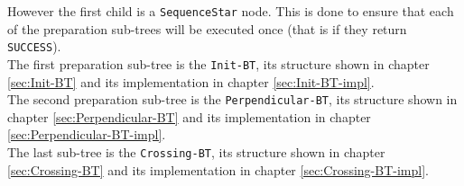     However the first child is a \texttt{SequenceStar} node. This is done to ensure that each of the preparation sub-trees will be executed once (that is if they return \texttt{SUCCESS}).\\
    The first preparation sub-tree is the \texttt{Init-BT}, its structure shown in chapter \ref{sec:Init-BT} and its implementation in chapter \ref{sec:Init-BT-impl}.\\
    The second preparation sub-tree is the \texttt{Perpendicular-BT}, its structure shown in chapter \ref{sec:Perpendicular-BT} and its implementation in chapter \ref{sec:Perpendicular-BT-impl}.\\
    The last sub-tree is the \texttt{Crossing-BT}, its structure shown in chapter \ref{sec:Crossing-BT} and its implementation in chapter \ref{sec:Crossing-BT-impl}.

